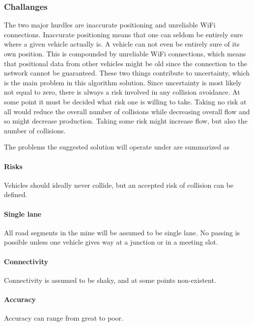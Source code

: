 \documentclass{article}
\begin{document}
			\subsubsection{Challanges}
				The two major hurdles are inaccurate positioning and unreliable WiFi connections. Inaccurate positioning means that one can seldom be entirely sure where a given vehicle actually is. A vehicle can not even be entirely sure of its own position. This is compounded by unreliable WiFi connections, which means that positional data from other vehicles might be old since the connection to the network cannot be guaranteed. These two things contribute to uncertainty, which is the main problem in this algorithm solution. Since uncertainty is most likely not equal to zero, there is always a risk involved in any collision avoidance. At some point it must be decided what risk one is willing to take. Taking no risk at all would reduce the overall number of collisions while decreasing overall flow and so might decrease production. Taking some risk might increase flow, but also the number of collisions.

				The problems the suggested solution will operate under are summarized as
				\paragraph{Risks}
					Vehicles should ideally never collide, but an accepted risk of collision can be defined.
				\paragraph{Single lane}
					All road segments in the mine will be assumed to be single lane. No passing is possible unless one vehicle gives way at a junction or in a meeting slot.
				\paragraph{Connectivity}
					Connectivity is assumed to be shaky, and at some points non-existent.
				\paragraph{Accuracy}
					Accuracy can range from great to poor.
\end{document}
